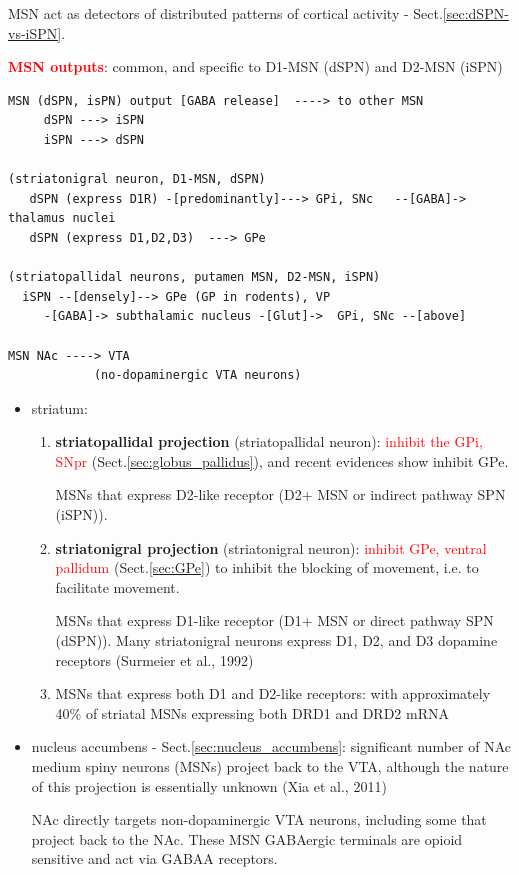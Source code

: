 MSN act as detectors of distributed patterns of cortical activity -
Sect.\ref{sec:dSPN-vs-iSPN}.

\textcolor{red}{\bf MSN outputs}: common, and specific to D1-MSN (dSPN) and
D2-MSN (iSPN)
\begin{verbatim}
MSN (dSPN, isPN) output [GABA release]  ----> to other MSN
     dSPN ---> iSPN
     iSPN ---> dSPN

(striatonigral neuron, D1-MSN, dSPN)
   dSPN (express D1R) -[predominantly]---> GPi, SNc   --[GABA]-> thalamus nuclei
   dSPN (express D1,D2,D3)  ---> GPe  

(striatopallidal neurons, putamen MSN, D2-MSN, iSPN) 
  iSPN --[densely]--> GPe (GP in rodents), VP 
     -[GABA]-> subthalamic nucleus -[Glut]->  GPi, SNc --[above]
 
MSN NAc ----> VTA
            (no-dopaminergic VTA neurons)
\end{verbatim}




\begin{itemize}
  \item striatum:
  
  \begin{enumerate}  

  \item {\bf striatopallidal projection} (striatopallidal neuron):
  \textcolor{red}{inhibit the GPi, SNpr} (Sect.\ref{sec:globus_pallidus}), and
  recent evidences show inhibit GPe. 
  
  MSNs that express D2-like receptor (D2+ MSN or indirect pathway SPN
  (iSPN)).
  
  \item {\bf striatonigral projection} (striatonigral neuron):
  \textcolor{red}{inhibit GPe, ventral pallidum} (Sect.\ref{sec:GPe}) to inhibit
  the blocking of movement, i.e. to facilitate movement.
  
  MSNs that express D1-like receptor (D1+ MSN or direct pathway SPN (dSPN)).
  Many striatonigral neurons express D1, D2, and D3 dopamine receptors
  (Surmeier et al., 1992)

   
  \item MSNs that express both D1 and D2-like receptors: with approximately 40\%
   of striatal MSNs expressing both DRD1 and DRD2 mRNA
   \end{enumerate}
   
   \item nucleus accumbens - Sect.\ref{sec:nucleus_accumbens}: significant
   number of NAc medium spiny neurons (MSNs) project back to the VTA, although
   the nature of this projection is essentially unknown (Xia et al., 2011)
   
   NAc directly targets non-dopaminergic VTA neurons, including some that
   project back to the NAc. These MSN GABAergic terminals are opioid sensitive
   and act via GABAA receptors.
   
\end{itemize}

